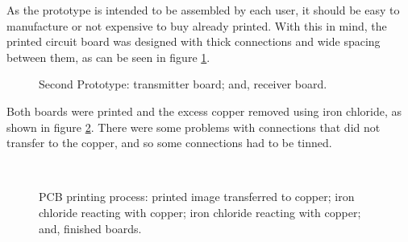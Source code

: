 As the prototype is intended to be assembled by each user, it should be easy to manufacture or not expensive to buy already printed. With this in mind, the printed circuit board was designed with thick connections and wide spacing between them, as can be seen in figure \ref{fig:prototype2}.\\
\begin{figure}[!htb]
  \centering
  \hspace{8pt}
  \caption[Second Prototype]{Second Prototype:
			 transmitter board; and,
			 receiver board.}%
  \label{fig:prototype2}%
\end{figure}

Both boards were printed and the excess copper removed using iron chloride, as shown in figure \ref{fig:pcbmaking}. There were some problems with connections that did not transfer to the copper, and so some connections had to be tinned.\\

\begin{figure}[!htb]
  \centering
  \hspace{8pt}
  \\
  \hspace{8pt}
  \caption[PCB printing process]{PCB printing process:
			 printed image transferred to copper;
			 iron chloride reacting with copper;
			 iron chloride reacting with copper; and,
			 finished boards.}%
  \label{fig:pcbmaking}%
\end{figure}

